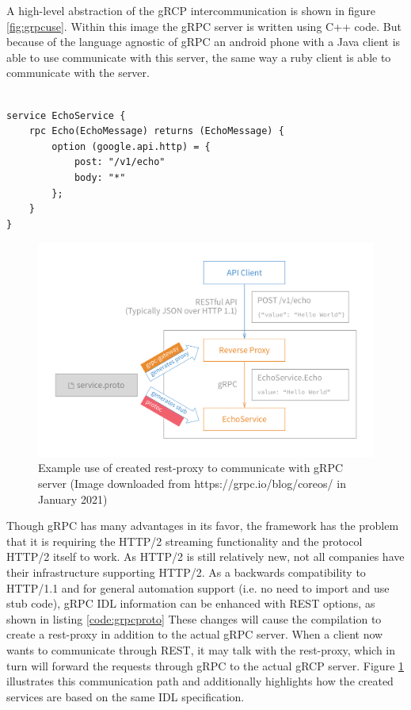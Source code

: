 \documentclass[conference]{IEEEtran}
\begin{document}
A high-level abstraction of the gRCP intercommunication is shown in figure \ref{fig:grpcuse}. Within this image the gRPC server is written using C++ code. But because of the language agnostic of gRPC an android phone with a Java client is able to use communicate with this server, the same way a ruby client is able to communicate with the server.

\begin{lstlisting}[name={Small sample proto buffer specification (Full example available at https://grpc.io/blog/coreos/)},label={code:grpcproto}]  % Start your code-block

service EchoService {
	rpc Echo(EchoMessage) returns (EchoMessage) {
		option (google.api.http) = {
			post: "/v1/echo"
			body: "*"
		};
	}
}
\end{lstlisting}

\begin{figure}
	\centering
	\includegraphics[width=0.8\linewidth]{grpc-rest-gateway.png}
	\caption{Example use of created rest-proxy to communicate with gRPC server (Image downloaded from https://grpc.io/blog/coreos/ in January 2021)}
	\label{fig:restProxy}
\end{figure}

Though gRPC has many advantages in its favor, the framework has the problem that it is requiring the HTTP/2 streaming functionality and the protocol HTTP/2 itself to work. As HTTP/2 is still relatively new, not all companies have their infrastructure supporting HTTP/2. As a backwards compatibility to HTTP/1.1 and for general automation support (i.e. no need to import and use stub code), gRPC IDL information can be enhanced with REST options, as shown in listing \ref{code:grpcproto} These changes will cause the compilation to create a rest-proxy in addition to the actual gRPC server. When a client now wants to communicate through REST, it may talk with the rest-proxy, which in turn will forward the requests through gRPC to the actual gRCP server. Figure \ref{fig:restProxy} illustrates this communication path and additionally highlights how the created services are based on the same IDL specification.
\end{document}
